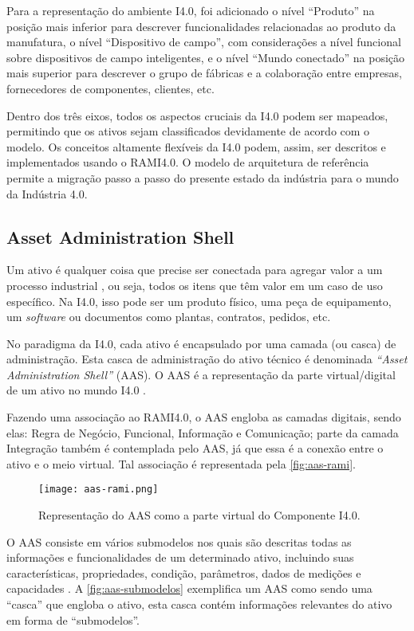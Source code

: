 Para a representação do ambiente I4.0, foi adicionado o nível ``Produto'' na posição mais inferior para descrever funcionalidades relacionadas ao produto da manufatura, o nível ``Dispositivo de campo'', com considerações a nível funcional sobre dispositivos de campo inteligentes, e o nível ``Mundo conectado'' na posição mais superior para descrever o grupo de fábricas e a colaboração entre empresas, fornecedores de componentes, clientes, etc.

Dentro dos três eixos, todos os aspectos cruciais da I4.0 podem ser mapeados, permitindo que os ativos sejam classificados devidamente de acordo com o modelo. Os conceitos altamente flexíveis da I4.0 podem, assim, ser descritos e implementados usando o RAMI4.0. O modelo de arquitetura de referência permite a migração passo a passo do presente estado da indústria para o mundo da Indústria 4.0.

\subsection{Asset Administration Shell}

Um ativo é qualquer coisa que precise ser conectada para agregar valor a um processo industrial \cite{bader2019aas}, ou seja, todos os itens que têm valor em um caso de uso específico. Na I4.0, isso pode ser um produto físico, uma peça de equipamento, um \textit{software} ou documentos como plantas, contratos, pedidos, etc.

No paradigma da I4.0, cada ativo é encapsulado por uma camada (ou casca) de administração. Esta casca de administração do ativo técnico é denominada \textit{``Asset Administration Shell''} (AAS). O AAS é a representação da parte virtual/digital de um ativo no mundo I4.0 \cite{ye2019aas}.

Fazendo uma associação ao RAMI4.0, o AAS engloba as camadas digitais, sendo elas: Regra de Negócio, Funcional, Informação e Comunicação; parte da camada Integração também é contemplada pelo AAS, já que essa é a conexão entre o ativo e o meio virtual. Tal associação é representada pela \autoref{fig:aas-rami}.

\begin{figure}[htb]
	\centering
	\texttt{[image: aas-rami.png]}
	\caption{Representação do AAS como a parte virtual do Componente I4.0.}
	\label{fig:aas-rami}
\end{figure}

O AAS consiste em vários submodelos nos quais são descritas todas as informações e funcionalidades de um determinado ativo, incluindo suas características, propriedades, condição, parâmetros, dados de medições e capacidades \cite{bader2019aas}. A \autoref{fig:aas-submodelos} exemplifica um AAS como sendo uma ``casca'' que engloba o ativo, esta casca contém informações relevantes do ativo em forma de ``submodelos''.

